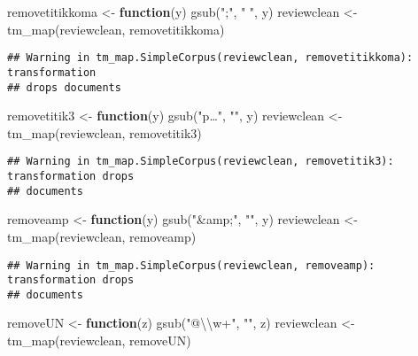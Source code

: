 \documentclass[
]{article}
\newenvironment{Shaded}{\begin{snugshade}}{\end{snugshade}}
\newcommand{\ControlFlowTok}[1]{\textcolor[rgb]{0.13,0.29,0.53}{\textbf{#1}}}
\newcommand{\FunctionTok}[1]{\textcolor[rgb]{0.00,0.00,0.00}{#1}}
\newcommand{\NormalTok}[1]{#1}
\newcommand{\OtherTok}[1]{\textcolor[rgb]{0.56,0.35,0.01}{#1}}
\newcommand{\SpecialCharTok}[1]{\textcolor[rgb]{0.00,0.00,0.00}{#1}}
\newcommand{\StringTok}[1]{\textcolor[rgb]{0.31,0.60,0.02}{#1}}
\begin{document}
\begin{Shaded}
\begin{Highlighting}[]
\NormalTok{removetitikkoma }\OtherTok{\textless{}{-}} \ControlFlowTok{function}\NormalTok{(y) }\FunctionTok{gsub}\NormalTok{(}\StringTok{";"}\NormalTok{, }\StringTok{" "}\NormalTok{, y)}
\NormalTok{reviewclean }\OtherTok{\textless{}{-}} \FunctionTok{tm\_map}\NormalTok{(reviewclean, removetitikkoma)}
\end{Highlighting}
\end{Shaded}

\begin{verbatim}
## Warning in tm_map.SimpleCorpus(reviewclean, removetitikkoma): transformation
## drops documents
\end{verbatim}

\begin{Shaded}
\begin{Highlighting}[]
\NormalTok{removetitik3 }\OtherTok{\textless{}{-}} \ControlFlowTok{function}\NormalTok{(y) }\FunctionTok{gsub}\NormalTok{(}\StringTok{"p…"}\NormalTok{, }\StringTok{""}\NormalTok{, y)}
\NormalTok{reviewclean }\OtherTok{\textless{}{-}} \FunctionTok{tm\_map}\NormalTok{(reviewclean, removetitik3)}
\end{Highlighting}
\end{Shaded}

\begin{verbatim}
## Warning in tm_map.SimpleCorpus(reviewclean, removetitik3): transformation drops
## documents
\end{verbatim}

\begin{Shaded}
\begin{Highlighting}[]
\NormalTok{removeamp }\OtherTok{\textless{}{-}} \ControlFlowTok{function}\NormalTok{(y) }\FunctionTok{gsub}\NormalTok{(}\StringTok{"\&amp;"}\NormalTok{, }\StringTok{""}\NormalTok{, y)}
\NormalTok{reviewclean }\OtherTok{\textless{}{-}} \FunctionTok{tm\_map}\NormalTok{(reviewclean, removeamp)}
\end{Highlighting}
\end{Shaded}

\begin{verbatim}
## Warning in tm_map.SimpleCorpus(reviewclean, removeamp): transformation drops
## documents
\end{verbatim}

\begin{Shaded}
\begin{Highlighting}[]
\NormalTok{removeUN }\OtherTok{\textless{}{-}} \ControlFlowTok{function}\NormalTok{(z) }\FunctionTok{gsub}\NormalTok{(}\StringTok{"@}\SpecialCharTok{\textbackslash{}\textbackslash{}}\StringTok{w+"}\NormalTok{, }\StringTok{""}\NormalTok{, z)}
\NormalTok{reviewclean }\OtherTok{\textless{}{-}} \FunctionTok{tm\_map}\NormalTok{(reviewclean, removeUN)}
\end{Highlighting}
\end{Shaded}
\end{document}

